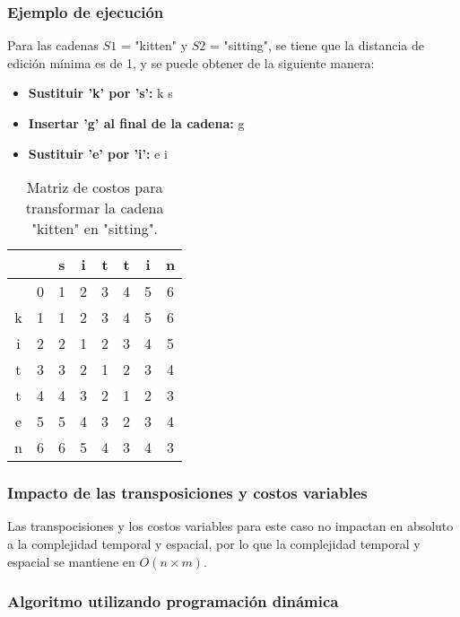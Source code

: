\subsubsection{Ejemplo de ejecución}

Para las cadenas $S1$ = "kitten" y $S2$ = "sitting", se tiene que la distancia de edición mínima es de 1,
y se puede obtener de la siguiente manera:

\begin{itemize}
    \item \textbf{Sustituir 'k' por 's':} k \textrightarrow s
    \item \textbf{Insertar 'g' al final de la cadena:} \textrightarrow g
    \item \textbf{Sustituir 'e' por 'i':} e \textrightarrow i
\end{itemize}

\begin{table}[H]
    \centering
    \begin{tabular}{|c|c|c|c|c|c|c|c|}
        \hline
        & & s & i & t & t & i & n \\
        \hline
        & 0 & 1 & 2 & 3 & 4 & 5 & 6 \\
        \hline
        k & 1 & 1 & 2 & 3 & 4 & 5 & 6 \\
        \hline
        i & 2 & 2 & 1 & 2 & 3 & 4 & 5 \\
        \hline
        t & 3 & 3 & 2 & 1 & 2 & 3 & 4 \\
        \hline
        t & 4 & 4 & 3 & 2 & 1 & 2 & 3 \\
        \hline
        e & 5 & 5 & 4 & 3 & 2 & 3 & 4 \\
        \hline
        n & 6 & 6 & 5 & 4 & 3 & 4 & 3 \\
        \hline
    \end{tabular}
    \caption{Matriz de costos para transformar la cadena "kitten" en "sitting".}
    \label{tab:matriz_costos}
\end{table}

\subsubsection{Impacto de las transposiciones y costos variables}

Las transpocisiones y los costos variables para este caso no impactan en absoluto a la complejidad temporal y espacial, 
por lo que la complejidad temporal y espacial se mantiene en $O(n \times m)$.

\subsubsection{Algoritmo utilizando programación dinámica}

